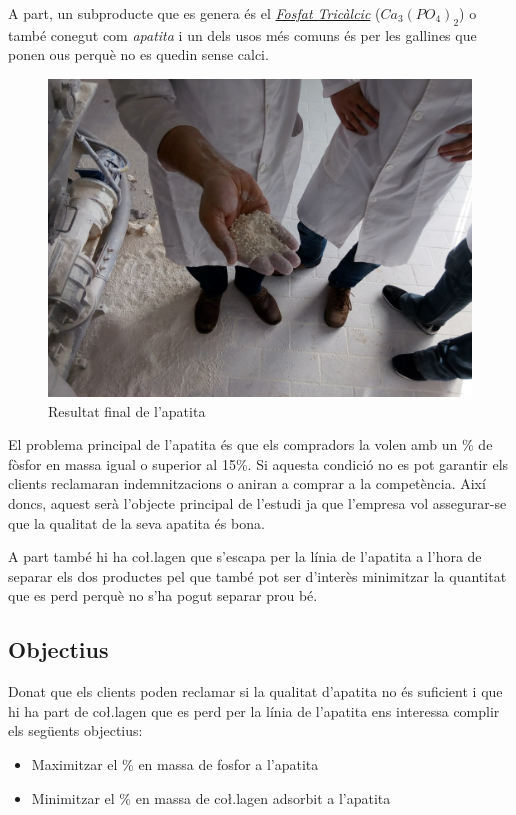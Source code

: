 \documentclass[a4paper]{article}
\begin{document}
A part, un subproducte que es genera és el \emph{\href{https://es.wikipedia.org/wiki/Fosfato_tric\%C3\%A1lcico}{Fosfat Tricàlcic}} ($Ca_3 (PO_4)_2$) o també conegut com \emph{apatita} i un dels usos més comuns és per les gallines que ponen ous perquè no es quedin sense calci. 

\begin{figure}[H]
	\centering
	\includegraphics[width=.8\textwidth]{images/protein/final-compressed}
	\caption{Resultat final de l'apatita}
	\label{fig:Final}
\end{figure} 	

El problema principal de l'apatita és que els compradors la volen amb un \% de fòsfor en massa igual o superior al 15\%. Si aquesta condició no es pot garantir els clients reclamaran indemnitzacions o aniran a comprar a la competència. Així doncs, aquest serà l'objecte principal de l'estudi ja que l'empresa vol assegurar-se que la qualitat de la seva apatita és bona. 

A part també hi ha co\l.lagen que s'escapa per la línia de l'apatita a l'hora de separar els dos productes pel que també pot ser d'interès minimitzar la quantitat que es perd perquè no s'ha pogut separar prou bé.

\subsection{Objectius}
Donat que els clients poden reclamar si la qualitat d'apatita no és suficient i que hi ha part de co\l.lagen que es perd per la línia de l'apatita ens interessa complir els següents objectius:

\begin{itemize}
	\item Maximitzar el \% en massa de fosfor a l'apatita
	\item Minimitzar el \% en massa de co\l.lagen adsorbit a l'apatita
\end{itemize}
\end{document}
